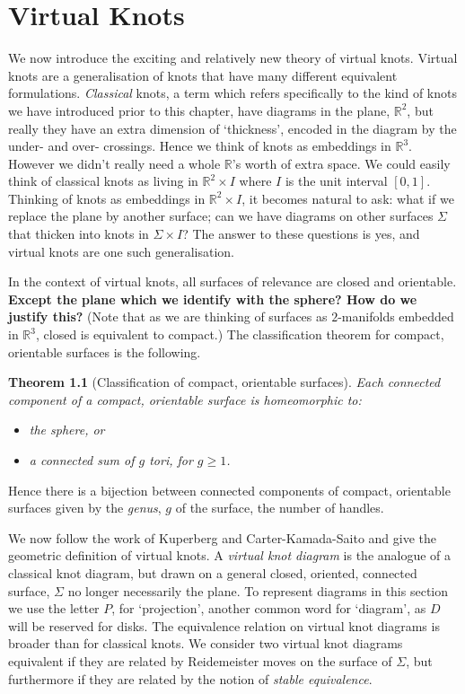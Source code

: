 \documentclass[12pt]{report}
\newcommand{\R}{\mathbb{R}}
\newcommand{\notered}[1]{{\color{Red} \textbf{#1}}}
\newtheorem*{theorem}{Theorem}
\begin{document}
\chapter{Virtual Knots}
We now introduce the exciting and relatively new theory of virtual knots. Virtual knots are a generalisation of knots that have many different equivalent formulations. \textit{Classical} knots, a term which refers specifically to the kind of knots we have introduced prior to this chapter, have diagrams in the plane, $\R^{2}$, but really they have an extra dimension of `thickness', encoded in the diagram by the under- and over- crossings. Hence we think of knots as embeddings in $\R^{3}$. However we didn't really need a whole $\R$'s worth of extra space. We could easily think of classical knots as living in $\R^{2} \times I$ where $I$ is the unit interval $[0, 1]$. Thinking of knots as embeddings in $\R^{2} \times I$, it becomes natural to ask: what if we replace the plane by another surface; can we have diagrams on other surfaces $\Sigma$ that thicken into knots in $\Sigma \times I$? The answer to these questions is yes, and virtual knots are one such generalisation.

In the context of virtual knots, all surfaces of relevance are closed and orientable. \notered{Except the plane which we identify with the sphere? How do we justify this?} (Note that as we are thinking of surfaces as $2$-manifolds embedded in $\R^{3}$, closed is equivalent to compact.) The classification theorem for compact, orientable surfaces is the following.

\begin{theorem}[Classification of compact, orientable surfaces]
Each connected component of a compact, orientable surface is homeomorphic to:
\begin{itemize}
\item the sphere, or
\item a connected sum of $g$ tori, for $g \geq 1$.
\end{itemize}
\end{theorem}
Hence there is a bijection between connected components of compact, orientable surfaces given by the \textit{genus}, $g$ of the surface, the number of handles.

We now follow the work of Kuperberg \cite{what-is-a-virtual-link} and Carter-Kamada-Saito \cite{stable-equivalence-virtual-cobordisms} and give the geometric definition of virtual knots. A \textit{virtual knot diagram} is the analogue of a classical knot diagram, but drawn on a general closed, oriented, connected surface, $\Sigma$ no longer necessarily the plane. To represent diagrams in this section we use the letter $P$, for `projection', another common word for `diagram', as $D$ will be reserved for disks. The equivalence relation on virtual knot diagrams is broader than for classical knots. We consider two virtual knot diagrams equivalent if they are related by Reidemeister moves on the surface of $\Sigma$, but furthermore if they are related by the notion of \textit{stable equivalence}.
\end{document}
